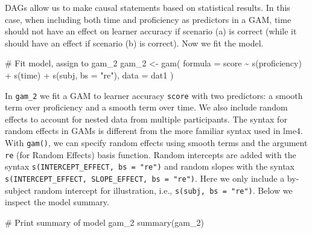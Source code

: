 \documentclass[
  letterpaper,
  DIV=11,
  numbers=noendperiod]{scrartcl}
\newenvironment{Shaded}{\begin{snugshade}}{\end{snugshade}}
\newcommand{\AttributeTok}[1]{\textcolor[rgb]{0.40,0.45,0.13}{#1}}
\newcommand{\CommentTok}[1]{\textcolor[rgb]{0.37,0.37,0.37}{#1}}
\newcommand{\FunctionTok}[1]{\textcolor[rgb]{0.28,0.35,0.67}{#1}}
\newcommand{\NormalTok}[1]{\textcolor[rgb]{0.00,0.23,0.31}{#1}}
\newcommand{\OtherTok}[1]{\textcolor[rgb]{0.00,0.23,0.31}{#1}}
\newcommand{\SpecialCharTok}[1]{\textcolor[rgb]{0.37,0.37,0.37}{#1}}
\newcommand{\StringTok}[1]{\textcolor[rgb]{0.13,0.47,0.30}{#1}}
\begin{document}
DAGs allow us to make causal statements based on statistical results. In
this case, when including both time and proficiency as predictors in a
GAM, time should not have an effect on learner accuracy if scenario (a)
is correct (while it should have an effect if scenario (b) is correct).
Now we fit the model.

\begin{Shaded}
\begin{Highlighting}[]
\CommentTok{\# Fit model, assign to \textquotesingle{}gam\_2\textquotesingle{}}
\NormalTok{gam\_2 }\OtherTok{\textless{}{-}} \FunctionTok{gam}\NormalTok{(}
  \AttributeTok{formula =}\NormalTok{ score }\SpecialCharTok{\textasciitilde{}} \FunctionTok{s}\NormalTok{(proficiency) }\SpecialCharTok{+} \FunctionTok{s}\NormalTok{(time) }\SpecialCharTok{+} \FunctionTok{s}\NormalTok{(subj, }\AttributeTok{bs =} \StringTok{"re"}\NormalTok{),}
  \AttributeTok{data =}\NormalTok{ dat1}
\NormalTok{)}
\end{Highlighting}
\end{Shaded}

In \texttt{gam\_2} we fit a GAM to learner accuracy \texttt{score} with
two predictors: a smooth term over proficiency and a smooth term over
time. We also include random effects to account for nested data from
multiple participants. The syntax for random effects in GAMs is
different from the more familiar syntax used in lme4. With
\texttt{gam()}, we can specify random effects using smooth terms and the
argument \texttt{re} (for Random Effects) basis function. Random
intercepts are added with the syntax
\texttt{s(INTERCEPT\_EFFECT,\ bs\ =\ "re")} and random slopes with the
syntax \texttt{s(INTERCEPT\_EFFECT,\ SLOPE\_EFFECT,\ bs\ =\ "re")}. Here
we only include a by-subject random intercept for illustration, i.e.,
\texttt{s(subj,\ bs\ =\ "re")}. Below we inspect the model summary.

\begin{Shaded}
\begin{Highlighting}[]
\CommentTok{\# Print summary of model \textquotesingle{}gam\_2\textquotesingle{}}
\FunctionTok{summary}\NormalTok{(gam\_2)}
\end{Highlighting}
\end{Shaded}
\end{document}
